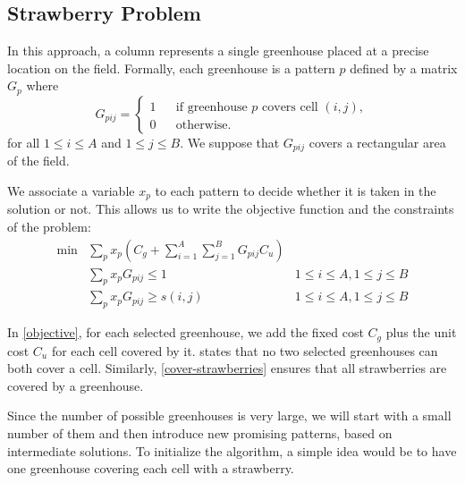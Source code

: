 \subsection{Strawberry Problem}

In this approach, a column represents a single greenhouse placed at a precise location on the field.
Formally, each greenhouse is a pattern $p$ defined by a matrix $G_{p}$ where
\begin{equation}
    G_{pij} = \left\{ \begin{array}{lcl}
        1 && \text{if greenhouse }p\text{ covers cell }(i,j), \\
        0 && \text{otherwise}.
    \end{array} \right.
\end{equation}
for all $1 \le i \le A$ and $1 \le j \le B$.
We suppose that $G_{pij}$ covers a rectangular area of the field.

We associate a variable $x_p$ to each pattern to decide whether it is taken in the solution or not.
This allows us to write the objective function and the constraints of the problem:
\begin{align}
    \min &\sum_p x_p \left( C_g + \sum_{i=1}^A \sum_{j=1}^B G_{pij} C_u \right) & \label{objective}\\
    &\sum_p x_p G_{pij} \le 1 & 1 \le i \le A, 1 \le j \le B \label{no-overlap}\\
    &\sum_p x_p G_{pij} \ge s(i,j) & 1 \le i \le A, 1 \le j \le B \label{cover-strawberries}
\end{align}

In \cref{objective}, for each selected greenhouse, we add the fixed cost $C_g$ plus the unit cost $C_u$ for each cell covered by it.
 states that no two selected greenhouses can both cover a cell.
Similarly, \cref{cover-strawberries} ensures that all strawberries are covered by a greenhouse.

Since the number of possible greenhouses is very large, we will start with a small number of them
and then introduce new promising patterns, based on intermediate solutions.
To initialize the algorithm, a simple idea would be to have one greenhouse covering each cell with a strawberry.

